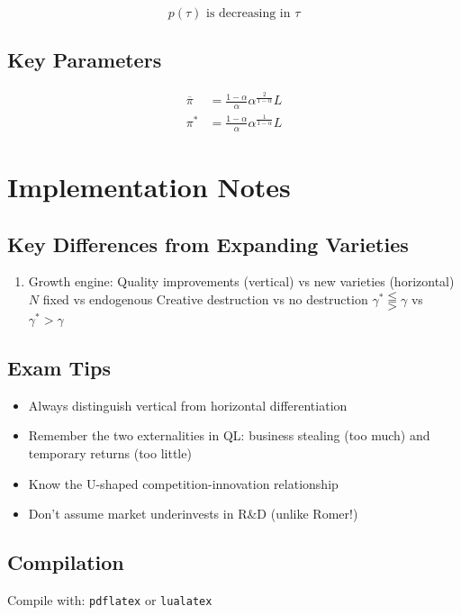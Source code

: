 \documentclass[a4paper,11pt]{article}
\begin{document}
\[
\boxed{p(\tau) \text{ is decreasing in } \tau}
\tag{Tax on Innovation}
\]

\subsection*{Key Parameters}
\begin{align*}
\overline{\pi} &= \frac{1-\alpha}{\alpha}\alpha^{\frac{2}{1-\alpha}}L \\
\pi^* &= \frac{1-\alpha}{\alpha}\alpha^{\frac{1}{1-\alpha}}L
\end{align*}

\clearpage

\section{Implementation Notes}

\subsection*{Key Differences from Expanding Varieties}
\begin{enumerate}
    \item Growth engine: Quality improvements (vertical) vs new varieties (horizontal)
    $N$ fixed vs endogenous
    Creative destruction vs no destruction
    $\gamma^* \lesseqqgtr \gamma$ vs $\gamma^* > \gamma$
\end{enumerate}

\subsection*{Exam Tips}
\begin{itemize}
    \item Always distinguish vertical from horizontal differentiation
    \item Remember the two externalities in QL: business stealing (too much) and temporary returns (too little)
    \item Know the U-shaped competition-innovation relationship
    \item Don't assume market underinvests in R\&D (unlike Romer!)
\end{itemize}

\subsection*{Compilation}
Compile with: \texttt{pdflatex} or \texttt{lualatex}

\clearpage
\end{document}

